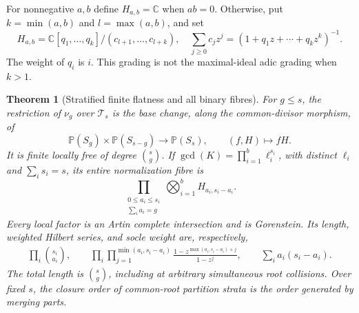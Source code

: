 \documentclass[11pt,reqno]{amsart}
\numberwithin{equation}{section}
\newtheorem{theorem}{Theorem}[section]
\theoremstyle{definition}\newtheorem{definition}[theorem]{Definition}
\theoremstyle{remark}\newtheorem{remark}[theorem]{Remark}
\newcommand{\C}{\mathbb C}\newcommand{\Q}{\mathbb Q}
\newcommand{\Pj}{\mathbb P}\newcommand{\A}{\mathbb A}
\begin{document}
For nonnegative $a,b$ define $H_{a,b}=\C$ when $ab=0$. Otherwise,
put $k=\min(a,b)$ and $l=\max(a,b)$, and set
\begin{equation}\label{eq:H-ab-v153}
 H_{a,b}=\C[q_1,\ldots,q_k]/(c_{l+1},\ldots,c_{l+k}),\quad
 \sum_{j\geq0}c_jz^j=(1+q_1z+\cdots+q_kz^k)^{-1}.
\end{equation}
The weight of $q_i$ is $i$. This grading is not the maximal-ideal
adic grading when $k>1$.

\begin{theorem}[Stratified finite flatness and all binary fibres]
\label{thm:binary-fibres-v153}
For $g\leq s$, the restriction of $\nu_g$ over $\mathcal T_s$ is the
base change, along the common-divisor morphism, of
\[
 \Pj(S_g)\times\Pj(S_{s-g})\longrightarrow\Pj(S_s),\qquad (f,H)\mapsto fH.
\]
It is finite locally free of degree $\binom{s}{g}$. If
$\gcd(K)=\prod_{i=1}^{b}\ell_i^{s_i}$, with distinct $\ell_i$ and
$\sum_i s_i=s$, its entire normalization fibre is
\begin{equation}\label{eq:binary-fibre-product-v153}
 \prod_{\substack{0\leq a_i\leq s_i\\\sum_i a_i=g}}
                   \bigotimes_{i=1}^{b} H_{a_i,s_i-a_i}.
\end{equation}
Every local factor is an Artin complete intersection and is Gorenstein.
Its length, weighted Hilbert series, and socle weight are, respectively,
\begin{gather*}
 \prod_i\binom{s_i}{a_i},\qquad
 \prod_i\prod_{j=1}^{\min(a_i,s_i-a_i)}
       \frac{1-z^{\max(a_i,s_i-a_i)+j}}{1-z^j},\qquad
 \sum_i a_i(s_i-a_i).
\end{gather*}
The total length is $\binom{s}{g}$, including at arbitrary simultaneous
root collisions. Over fixed $s$, the closure order of common-root
partition strata is the order generated by merging parts.
\end{theorem}
\end{document}
